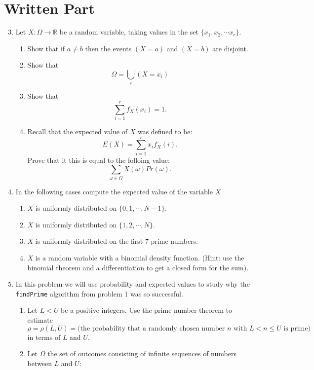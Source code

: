 \documentclass[11pt]{article}
\newcommand{\bR}{\mathbb{R}}
\begin{document}
\section*{Written Part}
\begin{enumerate}
  \setcounter{enumi}{2}
  \item{
  Let $X:\Omega\to\bR$ be a random variable, taking values in the set $\{x_1,x_2,\cdots x_r\}$.
  \begin{enumerate}
    \item{
    Show that if $a\not=b$ then the events $(X=a)$ and $(X=b)$ are disjoint.
    }
    \item{
    Show that
    \[\Omega = \bigcup_{i}(X=x_i)\]
    }
    \item{
    Show that
    \[\sum_{i=1}^r f_X(x_i) = 1.\]
    }
    \item{
    Recall that the expected value of $X$ was defined to be:
    \[E(X) = \sum_{i=1}^r x_i f_X(i).\]
    Prove that it this is equal to the folloing value:
    \[\sum_{\omega\in\Omega}X(\omega)Pr(\omega).\]
    }
  \end{enumerate}
  }
  \item{
  In the following cases compute the expected value of the variable $X$
  \begin{enumerate}
    \item{
    $X$ is uniformly distributed on $\{0,1,\cdots,N-1\}$.
    }
    \item{
    $X$ is uniformly distributed on $\{1,2,\cdots,N\}$.
    }
    \item{
    $X$ is uniformly distributed on the first 7 prime numbers.
    }
    \item{
    $X$ is a random variable with a binomial density function.  (Hint: use the binomial theorem and a differentiation to get a closed form for the sum).
    }
  \end{enumerate}
  }
  \item{
  In this problem we will use probability and expected values to study why the \verb|findPrime| algorithm from problem 1 was so successful.
  \begin{enumerate}
    \item{
    Let $L<U$ be a positive integers.  Use the prime number theorem to estimate
    \[\rho = \rho(L,U)=\text{(the probability that a randomly chosen number $n$ with $L<n\le U$ is prime)}\]
    in terms of $L$ and $U$.
    }
    \item{
    Let $\Omega$ the set of outcomes consisting of infinite sequences of numbers between $L$ and $U$:
}
\end{enumerate}}
\end{enumerate}
\end{document}

